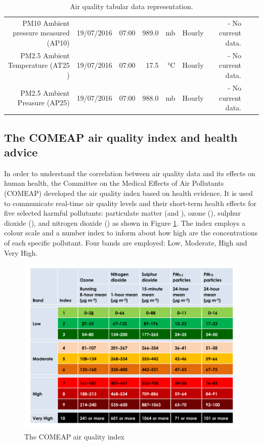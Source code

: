 \begin{table}[ht]
\begin{adjustbox}{width=1.2\textwidth,center=\textwidth}
\begin{tabular}{rlrrrrrrr}
	PM10 Ambient pressure measured (AP10) & 19/07/2016 & 07:00 & 989.0 & mb & Hourly & - No current data. \\
	PM2.5 Ambient Temperature (AT25 ) & 19/07/2016 & 07:00 & 17.5 & °C & Hourly & - No current data. \\
	PM2.5 Ambient Preasure (AP25) & 19/07/2016 & 07:00 & 988.0 & mb & Hourly & - No current data. \\
   \hline
\end{tabular}
\end{adjustbox}
\caption{Air quality tabular data representation. \cite{DepartmentforEnvironment}}
\label{tab:pollution_tabular_data}
\end{table} 

\subsection{The COMEAP air quality index and health advice}
In order to understand the correlation between air quality data and its effects on human health, the Committee on the Medical Effects of Air Pollutants (COMEAP) developed the air quality index based on health evidence. It is used to communicate real-time air quality levels and their short-term health effects for five selected harmful pollutants: particulate matter (\PMTEN and \PMTWO), ozone (\OTHREE), sulphur dioxide (\SOTWO), and nitrogen dioxide (\NOTWO) as shown in Figure \ref{fig:air_quality_index}. The index employs a colour scale and a number index to inform about how high are the concentrations of each specific pollutant. Four bands are employed: Low, Moderate, High and Very High. 

\begin{figure}[H]
\begin{adjustbox}{width=1\textwidth,center=\textwidth}
  \centering
  \includegraphics[scale=.8]{images/air_quality_index.png}
\end{adjustbox}
  \caption[The COMEAP air quality index]{The COMEAP air quality index \cite{HealthProtectionAgencyfortheCommitteeontheMedicalEffectsofAirPollutants2011}}
  \label{fig:air_quality_index}
\end{figure}

